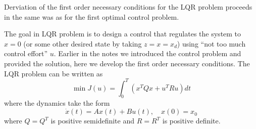 Derviation of the first order necessary conditions for the LQR problem proceeds in the same was as for the first optimal control problem.

The goal in LQR problem is to design a control that regulates the system to $x = 0$ (or some other desired state by taking $z = x = x_d$) using ``not too much control effort'' $u$. Earlier in the notes we introduced the control problem and provided the solution, here we develop the first order necessary conditions.
The LQR problem can be written as
$$\min J(u) = \int_0^{T} (x^TQx + u^TRu)dt$$
where the dynamics take the form
\begin{equation}\label{eqn:lqrdyn}
\dot x(t) = Ax(t) + Bu(t) , \quad x(0) = x_0
\end{equation}
where $Q=Q^T$ is positive semidefinite and $R = R^T$ is positive definite. 


